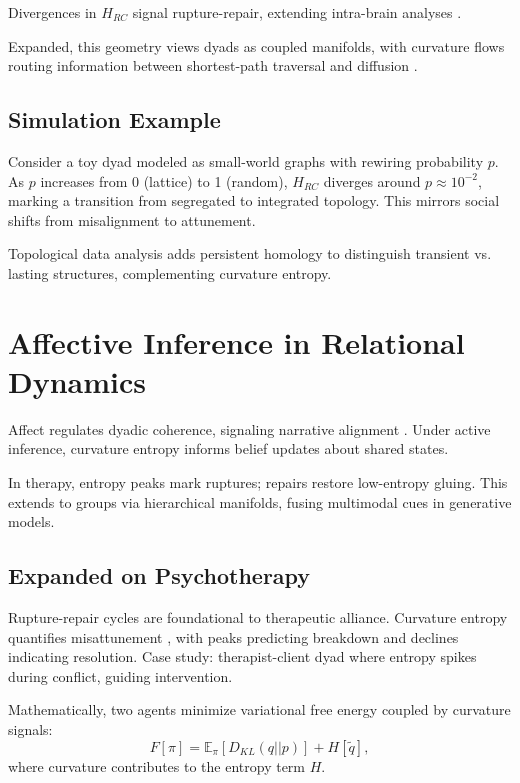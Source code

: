 \documentclass{article}
\theoremstyle{definition}
\begin{document}
Divergences in $H_{RC}$ signal rupture-repair, extending intra-brain analyses \cite{weber2019curvature,chatterjee2021detecting}.

Expanded, this geometry views dyads as coupled manifolds, with curvature flows routing information between shortest-path traversal and diffusion \cite{avena2019spectrum}.

\subsection{Simulation Example}

Consider a toy dyad modeled as small-world graphs with rewiring probability $p$. As $p$ increases from 0 (lattice) to 1 (random), $H_{RC}$ diverges around $p \approx 10^{-2}$, marking a transition from segregated to integrated topology. This mirrors social shifts from misalignment to attunement.

Topological data analysis adds persistent homology to distinguish transient vs. lasting structures, complementing curvature entropy.

\section{Affective Inference in Relational Dynamics}

Affect regulates dyadic coherence, signaling narrative alignment \cite{hinrichs2025hyperscanning}. Under active inference, curvature entropy informs belief updates about shared states.

In therapy, entropy peaks mark ruptures; repairs restore low-entropy gluing. This extends to groups via hierarchical manifolds, fusing multimodal cues in generative models.

\subsection{Expanded on Psychotherapy}

Rupture-repair cycles are foundational to therapeutic alliance. Curvature entropy quantifies misattunement \cite{bolis2017dialectical}, with peaks predicting breakdown and declines indicating resolution. Case study: therapist-client dyad where entropy spikes during conflict, guiding intervention.

Mathematically, two agents minimize variational free energy coupled by curvature signals:
\[
F[\pi] = \mathbb{E}_\pi [D_{KL}(q||p)] + H[\tilde{q}],
\]
where curvature contributes to the entropy term $H$.
\end{document}
